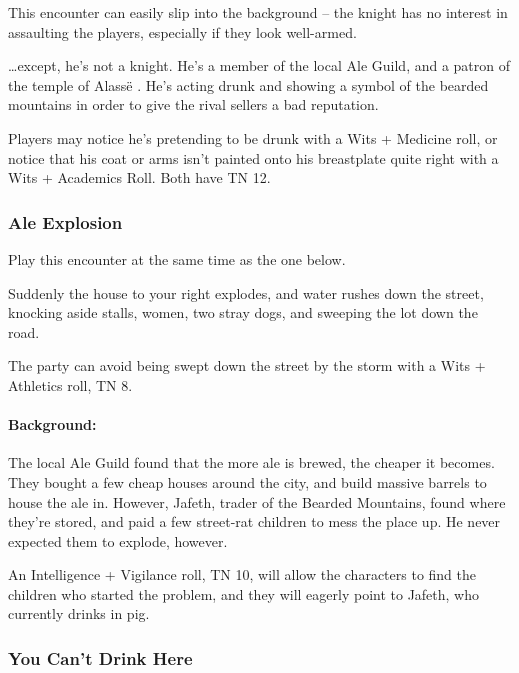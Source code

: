 This encounter can easily slip into the background -- the knight has no interest in assaulting the players, especially if they look well-armed.

\ldots except, he's not a knight.  He's a member of the local Ale Guild, and a patron of the temple of Alass\"e .   He's acting drunk and showing a symbol of the bearded mountains in order to give the rival sellers a bad reputation.

Players may notice he's pretending to be drunk with a Wits + Medicine roll, or notice that his coat or arms isn't painted onto his breastplate quite right with a Wits + Academics Roll.  Both have TN 12.



\subsubsection{Ale Explosion}

Play this encounter at the same time as the one below.

\begin{boxtext}
	Suddenly the house to your right explodes, and water rushes down the street, knocking aside stalls, women, two stray dogs, and sweeping the lot down the road.
\end{boxtext}

The party can avoid being swept down the street by the storm with a Wits + Athletics roll, TN 8.

\paragraph{Background:} The local Ale Guild found that the more ale is brewed, the cheaper it becomes.  They bought a few cheap houses around the city, and build massive barrels to house the ale in.  However, Jafeth, trader of the Bearded Mountains, found where they're stored, and paid a few street-rat children to mess the place up.  He never expected them to explode, however.

An Intelligence + Vigilance roll, TN 10, will allow the characters to find the children who started the problem, and they will eagerly point to Jafeth, who currently drinks in \gls{pig}.


\subsubsection{You Can't Drink Here}

